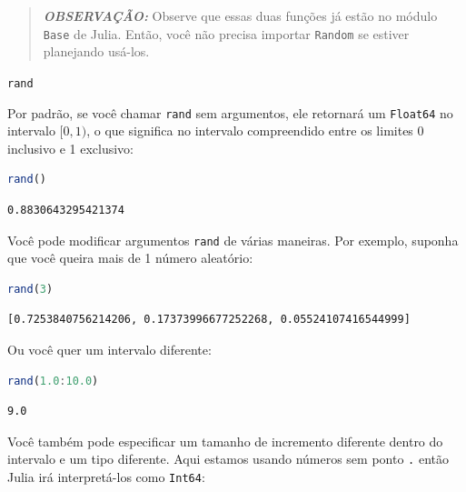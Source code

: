 \documentclass[
  notoc %
]{tufte-book}
\makeatletter
\newcommand{\passthrough}[1]{#1}
\renewcommand\subsubsection{%
\@startsection{subsubsection}{3}{\z@ }{-3.25ex\@plus -1ex \@minus -.2ex}{1.5ex \@plus .2ex}{\normalfont \normalsize \bfseries }
}
\makeatother
\begin{document}
\begin{quote}
\textbf{\emph{OBSERVAÇÃO:}} Observe que essas duas funções já estão no
módulo \passthrough{\lstinline!Base!} de Julia. Então, você não precisa
importar \passthrough{\lstinline!Random!} se estiver planejando usá-los.
\end{quote}

\hypertarget{sec:random_rand}{%
\subsubsection{\texorpdfstring{\texttt{rand}}{rand}}\label{sec:random_rand}}

Por padrão, se você chamar \passthrough{\lstinline!rand!} sem
argumentos, ele retornará um \passthrough{\lstinline!Float64!} no
intervalo \([0, 1)\), o que significa no intervalo compreendido entre os
limites 0 inclusivo e 1 exclusivo:

\begin{lstlisting}[language=Julia]
rand()
\end{lstlisting}

\begin{lstlisting}[language=Output]
0.8830643295421374
\end{lstlisting}

Você pode modificar argumentos \passthrough{\lstinline!rand!} de várias
maneiras. Por exemplo, suponha que você queira mais de 1 número
aleatório:

\begin{lstlisting}[language=Julia]
rand(3)
\end{lstlisting}

\begin{lstlisting}[language=Output]
[0.7253840756214206, 0.17373996677252268, 0.05524107416544999]
\end{lstlisting}

Ou você quer um intervalo diferente:

\begin{lstlisting}[language=Julia]
rand(1.0:10.0)
\end{lstlisting}

\begin{lstlisting}[language=Output]
9.0
\end{lstlisting}

Você também pode especificar um tamanho de incremento diferente dentro
do intervalo e um tipo diferente. Aqui estamos usando números sem ponto
\passthrough{\lstinline!.!} então Julia irá interpretá-los como
\passthrough{\lstinline!Int64!}:
\end{document}
